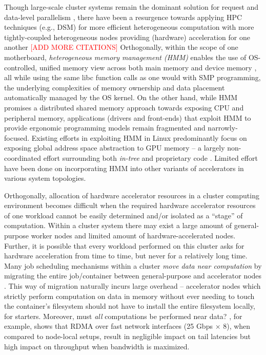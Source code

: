 \documentclass{article}
\begin{document}
Though large-scale cluster systems remain the dominant solution for request and
data-level parallelism \cite{BOOK.Hennessy_Patterson.CArch.2011},
there have been a resurgence towards applying HPC techniques (e.g., DSM) for more
efficient heterogeneous computation with more tightly-coupled heterogeneous nodes
providing (hardware) acceleration for one another \cite{Cabezas_etal.GPU-SM.2015}
\textcolor{red}{[ADD MORE CITATIONS]} Orthogonally, within the scope of one
motherboard, \emph{heterogeneous memory management (HMM)} enables the use of
OS-controlled, unified memory view across both main memory and device memory
\cite{WEB.NVIDIA.Harris.Unified_Memory_CUDA.2017}, all while using the same libc
function calls as one would with SMP programming, the underlying complexities of
memory ownership and data placement automatically managed by the OS kernel.
On the other hand, while HMM promises a distributed shared memory approach towards
exposing CPU and peripheral memory, applications (drivers and front-ends) that
exploit HMM to provide ergonomic programming models remain fragmented and
narrowly-focused. Existing efforts in exploiting HMM in Linux predominantly focus
on exposing global address space abstraction to GPU memory -- a largely
non-coordinated effort surrounding both \textit{in-tree} and proprietary code
\cites{WEB.LWN.Corbet.HMM_GPL_woes.2018}{WEB.Phoronix..HMM_Search_Results.2023}.
Limited effort have been done on incorporating HMM into other variants of
accelerators in various system topologies.

Orthogonally, allocation of hardware accelerator resources in a cluster computing
environment becomes difficult when the required hardware accelerator resources
of one workload cannot be easily determined and/or isolated as a ``stage'' of
computation. Within a cluster system there may exist a large amount of
general-purpose worker nodes and limited amount of hardware-accelerated nodes.
Further, it is possible that every workload performed on this cluster asks for
hardware acceleration from time to time, but never for a relatively long time.
Many job scheduling mechanisms within a cluster
\emph{move data near computation} by migrating the entire job/container between
general-purpose and accelerator nodes \cites{Rodriguez_etal.HPC_Cluster_Migration.2019}
{Oh_Kim.Container_Migration.2018}. This way of migration naturally incurs
large overhead -- accelerator nodes which strictly perform computation on data in memory
without ever needing to touch the container's filesystem should not have to install
the entire filesystem locally, for starters. Moreover, must \emph{all} computations be
performed near data? \cite{Masouros_etal.Adrias.2023}, for example, shows that RDMA over
fast network interfaces (25 Gbps $\times$ 8), when compared to node-local setups,
result in negligible impact on tail latencies but high impact on throughput when
bandwidth is maximized.
\end{document}
